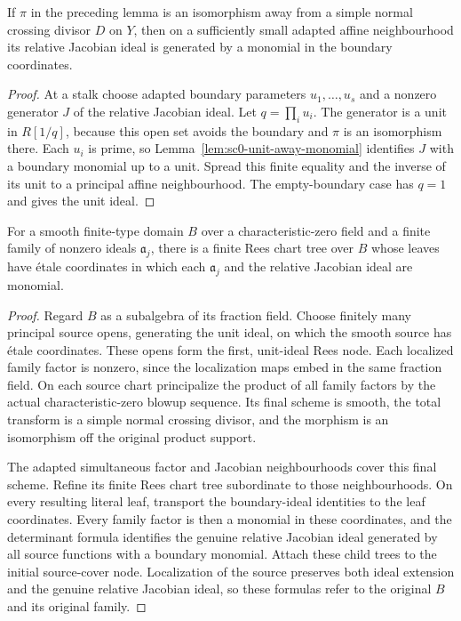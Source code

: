 \begin{lemma}\label{lem:sc0-jacobian-snc}
\notready
{}
If $\pi$ in the preceding lemma is an isomorphism away from a simple normal crossing divisor
$D$ on $Y$, then on a sufficiently small adapted affine neighbourhood its relative Jacobian
ideal is generated by a monomial in the boundary coordinates.
\end{lemma}
\begin{proof}
At a stalk choose adapted boundary parameters $u_1,\ldots,u_s$ and a nonzero generator $J$ of
the relative Jacobian ideal. Let $q=\prod_i u_i$. The generator is a unit in $R[1/q]$, because
this open set avoids the boundary and $\pi$ is an isomorphism there. Each $u_i$ is prime, so
Lemma~\ref{lem:sc0-unit-away-monomial} identifies $J$ with a
boundary monomial up to a unit. Spread this finite equality and the inverse of its unit to a
principal affine neighbourhood. The empty-boundary case has $q=1$ and gives the unit ideal.
\end{proof}

\begin{theorem}\label{thm:sc0-hironaka-log-tree}
\leanok
{}
For a smooth finite-type domain $B$ over a characteristic-zero field and a finite family of
nonzero ideals $\mathfrak a_j$, there is a finite Rees chart tree over $B$ whose leaves have
\'etale coordinates in which each $\mathfrak a_j$ and the relative Jacobian ideal are monomial.
\end{theorem}
\begin{proof}
Regard $B$ as a subalgebra of its fraction field. Choose finitely many principal
source opens, generating the unit ideal, on which the smooth source has
\'etale coordinates. These opens form the first, unit-ideal Rees node. Each
localized family factor is nonzero, since the localization maps embed in the
same fraction field. On each source chart principalize the product of all
family factors by the actual characteristic-zero blowup sequence. Its final
scheme is smooth, the total transform is a simple normal crossing divisor,
and the morphism is an isomorphism off the original product support.

The adapted simultaneous factor and Jacobian neighbourhoods cover this final
scheme. Refine its finite Rees chart tree subordinate to those neighbourhoods.
On every resulting literal leaf, transport the boundary-ideal identities to
the leaf coordinates. Every family factor is then a monomial in these
coordinates, and the determinant formula identifies the genuine relative
Jacobian ideal generated by all source functions with a boundary monomial.
Attach these child trees to the initial source-cover node. Localization of
the source preserves both ideal extension and the genuine relative Jacobian
ideal, so these formulas refer to the original $B$ and its original family.
\end{proof}
